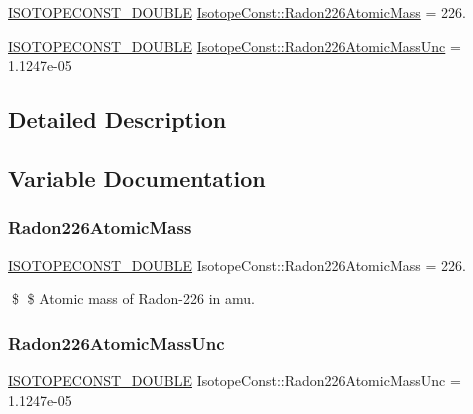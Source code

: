 \begin{DoxyCompactItemize}
\item 
\mbox{\hyperlink{group___isotope_const-_macros_ga8f45a7272ce02c0b4c65c44636ed719a}{I\+S\+O\+T\+O\+P\+E\+C\+O\+N\+S\+T\+\_\+\+D\+O\+U\+B\+LE}} \mbox{\hyperlink{group___isotope_const-_radon-_rn226_gad8fa10d04561c23181c0744c6fe66207}{Isotope\+Const\+::\+Radon226\+Atomic\+Mass}} = 226.
\item 
\mbox{\hyperlink{group___isotope_const-_macros_ga8f45a7272ce02c0b4c65c44636ed719a}{I\+S\+O\+T\+O\+P\+E\+C\+O\+N\+S\+T\+\_\+\+D\+O\+U\+B\+LE}} \mbox{\hyperlink{group___isotope_const-_radon-_rn226_ga0bc14cab10e64e880a7df769fc0a69ed}{Isotope\+Const\+::\+Radon226\+Atomic\+Mass\+Unc}} = 1.\+1247e-\/05
\end{DoxyCompactItemize}


\subsection{Detailed Description}


\subsection{Variable Documentation}
\mbox{\label{group___isotope_const-_radon-_rn226_gad8fa10d04561c23181c0744c6fe66207}} 
\subsubsection{\texorpdfstring{Radon226\+Atomic\+Mass}{Radon226AtomicMass}}
{\footnotesize\ttfamily \mbox{\hyperlink{group___isotope_const-_macros_ga8f45a7272ce02c0b4c65c44636ed719a}{I\+S\+O\+T\+O\+P\+E\+C\+O\+N\+S\+T\+\_\+\+D\+O\+U\+B\+LE}} Isotope\+Const\+::\+Radon226\+Atomic\+Mass = 226.}

\$ \$ Atomic mass of Radon-\/226 in amu. \mbox{\label{group___isotope_const-_radon-_rn226_ga0bc14cab10e64e880a7df769fc0a69ed}} 
\subsubsection{\texorpdfstring{Radon226\+Atomic\+Mass\+Unc}{Radon226AtomicMassUnc}}
{\footnotesize\ttfamily \mbox{\hyperlink{group___isotope_const-_macros_ga8f45a7272ce02c0b4c65c44636ed719a}{I\+S\+O\+T\+O\+P\+E\+C\+O\+N\+S\+T\+\_\+\+D\+O\+U\+B\+LE}} Isotope\+Const\+::\+Radon226\+Atomic\+Mass\+Unc = 1.\+1247e-\/05}

